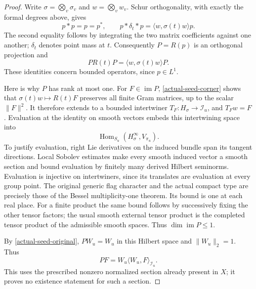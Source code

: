 \begin{proof}
Write $\sigma=\bigotimes_v\sigma_v$ and $w=\bigotimes_vw_v$.
Schur orthogonality, with exactly the formal degrees above, gives
\[
 p*p=p=p^*,\qquad
 p*\delta_t*p=\langle w,\sigma(t)w\rangle p.
\]
The second equality follows by integrating the two matrix
coefficients against one another; $\delta_t$ denotes point mass
at $t$.  Consequently $P=R(p)$ is an orthogonal projection and
\begin{equation}\label{actual-seed-corner}
        PR(t)P=\langle w,\sigma(t)w\rangle P.
\end{equation}
These identities concern bounded operators, since $p\in L^1$.

Here is why $P$ has rank at most one.  For $F\in\operatorname{im}P$,
\eqref{actual-seed-corner} shows that
$\sigma(t)w\mapsto R(t)F$ preserves all finite Gram matrices,
up to the scalar $\|F\|^2$.  It therefore extends to a bounded
intertwiner $T_F:H_\sigma\to\mathcal I_u$, and $T_Fw=F$.
Evaluation at the identity on smooth vectors embeds this
intertwining space into
\[
       \operatorname{Hom}_{S_u}(H_\sigma^\infty,V_{\pi_u}).
\]
To justify evaluation, right Lie derivatives on the induced bundle
span its tangent directions.  Local Sobolev estimates make every
smooth induced vector a smooth section and bound evaluation by
finitely many derived Hilbert seminorms.  Evaluation is injective
on intertwiners, since its translates are evaluation at every
group point.  The original generic flag character and the actual
compact type are precisely those of the Bessel multiplicity-one
theorem.  Its bound is one at each real place.  For a finite
product the same bound follows by successively fixing the other
tensor factors; the usual smooth external tensor product is
the completed tensor product of the admissible smooth spaces.
Thus $\dim\operatorname{im}P\le1$.\cite{pieri-family-jsz,pieri-family-cw}

By \eqref{actual-seed-original}, $PW_u=W_u$ in this Hilbert
space and $\|W_u\|_2=1$.  Thus
\begin{equation}\label{actual-seed-projection}
             PF=W_u\langle W_u,F\rangle_{\mathcal I_u}.
\end{equation}
This uses the prescribed nonzero normalized section already
present in $X$; it proves no existence statement for such a section.


\end{proof}
